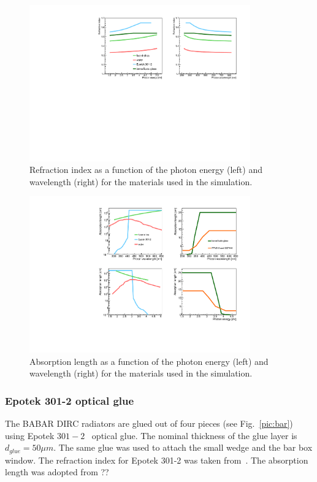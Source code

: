 \begin{figure}[!h]
\centering
\includegraphics[angle=0,width=0.85\textwidth]{pics/refind1.pdf}
\caption{\label{pic:mat1}
Refraction index as a function of the photon energy (left) and wavelength (right) for the materials used in the simulation.
}
\end{figure}

\begin{figure}[!h]
\centering
\includegraphics[angle=0,width=0.85\textwidth]{pics/ablen1.pdf}
\caption{\label{pic:mat2}
Absorption length as a function of the photon energy (left) and wavelength (right) for the materials used in the simulation.
}
\end{figure}

\subsubsection*{Epotek 301-2 optical glue}

The BABAR DIRC radiators are glued out of four pieces (see Fig.~\ref{pic:bar}) using Epotek $301-2$~\cite{Epotek} optical glue. The nominal thickness of the glue layer is $d_{glue} = 50 \mu m$. The same glue was used to attach the small wedge and the bar box window. The refraction index for Epotek 301-2 was taken from~\cite{EpotekData}. The absorption length was adopted from ??

